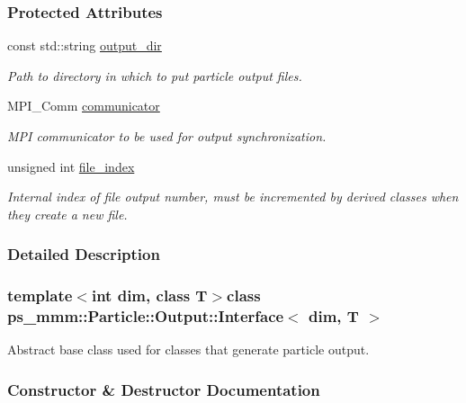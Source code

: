 \subsubsection*{Protected Attributes}
\begin{DoxyCompactItemize}
\item 
const std\+::string \hyperlink{classps__mmm_1_1_particle_1_1_output_1_1_interface_a61b1cff893c7c8909a3095cdc7c664b9}{output\+\_\+dir}
\begin{DoxyCompactList}\small\item\em Path to directory in which to put particle output files. \end{DoxyCompactList}\item 
M\+P\+I\+\_\+\+Comm \hyperlink{classps__mmm_1_1_particle_1_1_output_1_1_interface_ae3fcfd82092c40864ec09918f03b91d0}{communicator}
\begin{DoxyCompactList}\small\item\em M\+P\+I communicator to be used for output synchronization. \end{DoxyCompactList}\item 
unsigned int \hyperlink{classps__mmm_1_1_particle_1_1_output_1_1_interface_a8b748e316bf1e2f8c24b75cd99324e1b}{file\+\_\+index}
\begin{DoxyCompactList}\small\item\em Internal index of file output number, must be incremented by derived classes when they create a new file. \end{DoxyCompactList}\end{DoxyCompactItemize}


\subsubsection{Detailed Description}
\subsubsection*{template$<$int dim, class T$>$class ps\+\_\+mmm\+::\+Particle\+::\+Output\+::\+Interface$<$ dim, T $>$}

Abstract base class used for classes that generate particle output. 

\subsubsection{Constructor \& Destructor Documentation}
\hypertarget{classps__mmm_1_1_particle_1_1_output_1_1_interface_a7283e626e8d6e6e379e67034a698ccad}{}
